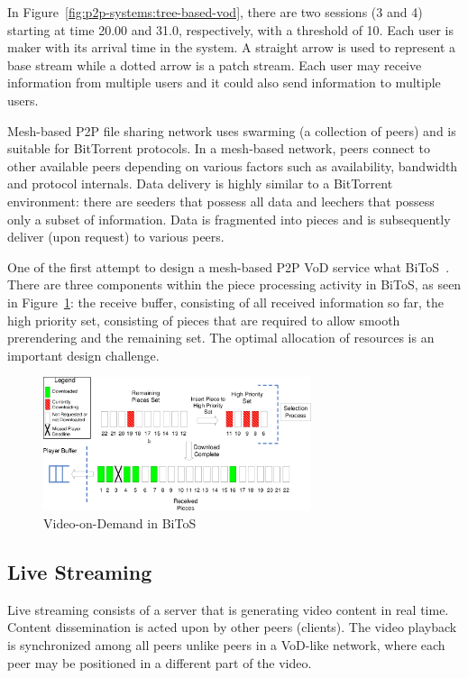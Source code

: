 In Figure~\ref{fig:p2p-systems:tree-based-vod}, there are two sessions (3 and 4) starting
at time 20.00 and
31.0, respectively, with a threshold of 10. Each user is maker with its
arrival time in the system. A straight arrow is used to represent a base
stream while a dotted arrow is a patch stream. Each user may receive
information from multiple users and it could also send information to multiple
users.

Mesh-based P2P file sharing network uses swarming (a collection of peers) and
is suitable for BitTorrent protocols. In a mesh-based network, peers connect
to other available peers depending on various factors such as availability,
bandwidth and protocol internals. Data delivery is highly similar to a
BitTorrent environment: there are seeders that possess all data and leechers
that possess only a subset of information. Data is fragmented into pieces and
is subsequently deliver (upon request) to various peers.

One of the first attempt to design a mesh-based P2P VoD service what
BiToS~\cite{bitos}. There are three components within the piece processing
activity in BiToS, as seen in Figure~\ref{fig:p2p-systems:bitos-vod}: the
receive buffer, consisting of all received information so far, the high
priority set, consisting of pieces that are required to allow smooth
prerendering and the remaining set. The optimal allocation of resources is an
important design challenge.

\begin{figure}
  \centering
  \includegraphics[width=0.7\textwidth]{src/img/p2p-systems/bitos-vod}
  \caption{Video-on-Demand in BiToS}
  \label{fig:p2p-systems:bitos-vod}
\end{figure}

\subsection{Live Streaming}
\label{subsec:p2p-systems:ls}

Live streaming consists of a server that is generating video content in real
time. Content dissemination is acted upon by other peers (clients). The video
playback is synchronized among all peers unlike peers in a VoD-like network,
where each peer may be positioned in a different part of the video.


